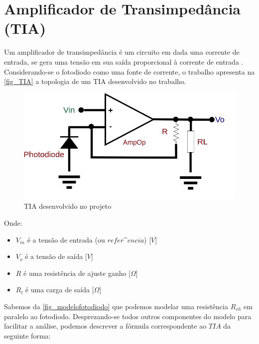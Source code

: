 \section{Amplificador de Transimped\^ancia (TIA)}
\label{section:TIA}

Um amplificador de transimped\^ancia \'e um circuito em dada uma corrente de entrada, se gera uma tens\~ao em sua sa\'ida proporcional \`a corrente de entrada \cite{RazaviFundM}. Considerando-se o fotodiodo como uma fonte de corrente, o trabalho apresenta na \autoref{fig_TIA} a topologia de um TIA desenvolvido no trabalho.

\begin{figure}[htb]
	\caption{\label{fig_TIA}TIA desenvolvido no projeto}
	\begin{center}
	    \includegraphics[scale=0.4]{Circuitos/TIA.png}
	\end{center}
\end{figure}

Onde:

\begin{itemize}
    \item $V_{in}$ \'e a tens\~ao de entrada (ou $refer\^encia$) [$V$]
    \item $V_o$ \'e a tens\~ao de sa\'ida [$V$]
    \item $R$ \'e uma resist\^encia de ajuste ganho [$\Omega$]
    \item $R_l$ \'e uma carga de sa\'ida [$\Omega$]
\end{itemize}

Sabemos da \ref{fig_modelofotodiodo} que podemos modelar uma resist\^encia $R_{sh}$ em paralelo ao fotodiodo. Desprezando-se todos outros componentes do modelo para facilitar a an\'alise, podemos descrever a f\'ormula correspondente ao $TIA$ da seguinte forma:

